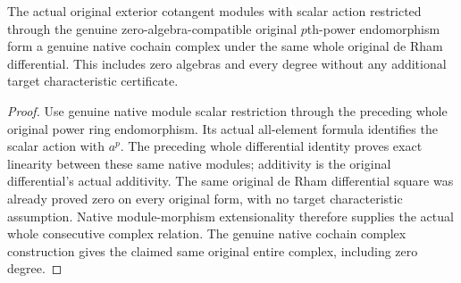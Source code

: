 \begin{theorem}
\label{thm:cartier-original-algebra-zero-frobenius-complex}
\leanok
The actual original exterior cotangent modules with scalar action
restricted through the genuine zero-algebra-compatible original
$p$th-power endomorphism form a genuine native cochain complex under
the same whole original de Rham differential. This includes zero
algebras and every degree without any additional target
characteristic certificate.
\end{theorem}
\begin{proof}
Use genuine native module scalar restriction through the preceding
whole original power ring endomorphism. Its actual all-element
formula identifies the scalar action with $a^p$. The preceding
whole differential identity proves exact linearity between these
same native modules; additivity is the original differential's
actual additivity. The same original de Rham differential square
was already proved zero on every original form, with no target
characteristic assumption. Native module-morphism extensionality
therefore supplies the actual whole consecutive complex relation.
The genuine native cochain complex construction gives the claimed
same original entire complex, including zero degree.
\end{proof}

